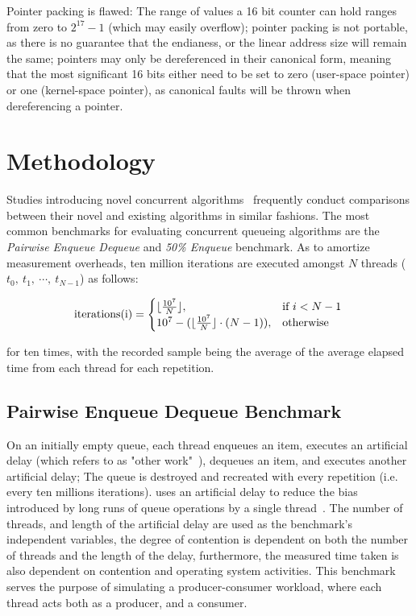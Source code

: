 Pointer packing is flawed: The range of values a 16 bit counter can hold ranges
from zero to $2^{17}-1$ (which may easily overflow); pointer packing is not
portable, as there is no guarantee that the endianess, or the linear address
size will remain the same; pointers may only be dereferenced in their canonical
form, meaning that the most significant 16 bits either need to be set to zero
(user-space pointer) or one (kernel-space pointer), as canonical faults will be
thrown when dereferencing a pointer.

\section{Methodology}

Studies introducing novel concurrent
algorithms~\citep{michael1996simple,valois1994queues,kogan2011wait,hoffman2007baskets,yang2016wait}
frequently conduct comparisons between their novel and existing algorithms in
similar fashions. The most common benchmarks for evaluating concurrent queueing
algorithms are the \emph{Pairwise Enqueue Dequeue} and \emph{50\% Enqueue}
benchmark. As to amortize measurement overheads, ten million iterations are
executed amongst $N$ threads ($t_0,~t_1,~\cdots,~t_{N-1}$) as follows: 

\[
    \text{iterations(i)} = 
    \begin{cases}
        \lfloor\frac{10^7}{N}\rfloor, & \text{if}~i < N-1 \\
        10^7 - (\lfloor \frac{10^7}{N} \rfloor \cdot (N-1)), & \text{otherwise}
    \end{cases} \\
\]

for ten times, with the recorded sample being the average of the average
elapsed time from each thread for each repetition.

\subsection{Pairwise Enqueue Dequeue Benchmark}

On an initially empty queue, each thread enqueues an item, executes an
artificial delay (which \citeauthor{michael1996simple} refers to as "other
work"~\citep{michael1996simple}), dequeues an item, and executes another
artificial delay; The queue is destroyed and recreated with every repetition
(i.e. every ten millions iterations). \citeauthor{michael1996simple} uses an
artificial delay to reduce the bias introduced by long runs of queue operations
by a single thread~\citep{michael1996simple}. The number of threads, and length
of the artificial delay are used as the benchmark's independent variables, the
degree of contention is dependent on both the number of threads and the length
of the delay, furthermore, the measured time taken is also dependent on
contention and operating system activities. This benchmark serves the purpose
of simulating a producer-consumer workload, where each thread acts both as a
producer, and a consumer.

